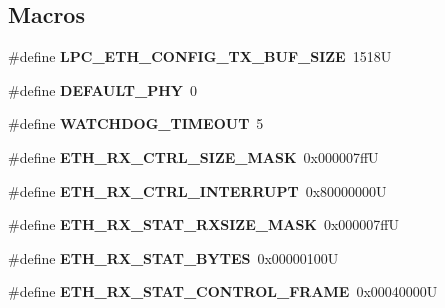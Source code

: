 \subsection*{Macros}
\begin{DoxyCompactItemize}
\item 
\mbox{\label{lpc-ethernet_8c_ac728aa3c853ae51d5250884e0f9c4198}} 
\#define {\bfseries L\+P\+C\+\_\+\+E\+T\+H\+\_\+\+C\+O\+N\+F\+I\+G\+\_\+\+T\+X\+\_\+\+B\+U\+F\+\_\+\+S\+I\+ZE}~1518U
\item 
\mbox{\label{lpc-ethernet_8c_a0fa1778b7ac45f087d9797d5868b96fc}} 
\#define {\bfseries D\+E\+F\+A\+U\+L\+T\+\_\+\+P\+HY}~0
\item 
\mbox{\label{lpc-ethernet_8c_abf89628d486477bd0db5a5890cd38a05}} 
\#define {\bfseries W\+A\+T\+C\+H\+D\+O\+G\+\_\+\+T\+I\+M\+E\+O\+UT}~5
\item 
\mbox{\label{lpc-ethernet_8c_a003639436efbeaa6568b90a1ae7f92c3}} 
\#define {\bfseries E\+T\+H\+\_\+\+R\+X\+\_\+\+C\+T\+R\+L\+\_\+\+S\+I\+Z\+E\+\_\+\+M\+A\+SK}~0x000007ffU
\item 
\mbox{\label{lpc-ethernet_8c_a1bca6c13982b7035cea2ccf26b88e615}} 
\#define {\bfseries E\+T\+H\+\_\+\+R\+X\+\_\+\+C\+T\+R\+L\+\_\+\+I\+N\+T\+E\+R\+R\+U\+PT}~0x80000000U
\item 
\mbox{\label{lpc-ethernet_8c_a2eaa9a1cd1f6fc2d051741e22098c45a}} 
\#define {\bfseries E\+T\+H\+\_\+\+R\+X\+\_\+\+S\+T\+A\+T\+\_\+\+R\+X\+S\+I\+Z\+E\+\_\+\+M\+A\+SK}~0x000007ffU
\item 
\mbox{\label{lpc-ethernet_8c_ae56c557ca95628be200cea6f2aa5a4aa}} 
\#define {\bfseries E\+T\+H\+\_\+\+R\+X\+\_\+\+S\+T\+A\+T\+\_\+\+B\+Y\+T\+ES}~0x00000100U
\item 
\mbox{\label{lpc-ethernet_8c_a4c27de7a2bd8338c14b6be7bdf4aae11}} 
\#define {\bfseries E\+T\+H\+\_\+\+R\+X\+\_\+\+S\+T\+A\+T\+\_\+\+C\+O\+N\+T\+R\+O\+L\+\_\+\+F\+R\+A\+ME}~0x00040000U
\item 
\mbox{\label{lpc-ethernet_8c_aef6e290d1fd0d3db31759570f0266627}} 

\end{DoxyCompactItemize}
